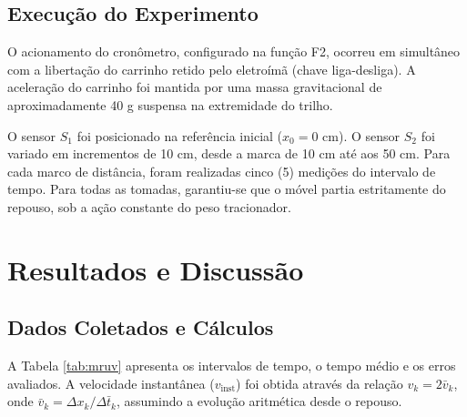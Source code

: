 \documentclass[12pt, a4paper]{article}
\begin{document}
\subsection{Execução do Experimento}
O acionamento do cronômetro, configurado na função F2, ocorreu em simultâneo com a libertação do carrinho retido pelo eletroímã (chave liga-desliga). A aceleração do carrinho foi mantida por uma massa gravitacional de aproximadamente 40 g suspensa na extremidade do trilho.

O sensor $S_1$ foi posicionado na referência inicial ($x_0 = 0\text{ cm}$). O sensor $S_2$ foi variado em incrementos de 10 cm, desde a marca de 10 cm até aos 50 cm. Para cada marco de distância, foram realizadas cinco (5) medições do intervalo de tempo. Para todas as tomadas, garantiu-se que o móvel partia estritamente do repouso, sob a ação constante do peso tracionador.

\section{Resultados e Discussão}

\subsection{Dados Coletados e Cálculos}
A Tabela \ref{tab:mruv} apresenta os intervalos de tempo, o tempo médio e os erros avaliados. A velocidade instantânea ($v_{\text{inst}}$) foi obtida através da relação $v_k = 2\bar{v}_k$, onde $\bar{v}_k = \Delta x_k / \Delta \bar{t}_k$, assumindo a evolução aritmética desde o repouso. 
\end{document}

